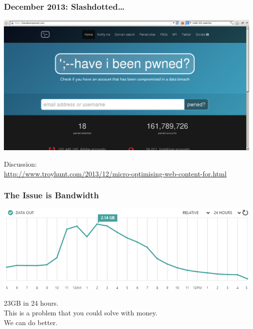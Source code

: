 \documentclass[aspectratio=43]{beamer}
\newenvironment{changemargin}[1]{%
  \begin{list}{}{%
    \setlength{\topsep}{0pt}%
    \setlength{\leftmargin}{#1}%
    \setlength{\rightmargin}{1em}
    \setlength{\listparindent}{\parindent}%
    \setlength{\itemindent}{\parindent}%
    \setlength{\parsep}{\parskip}%
  }%
  \item[]}{\end{list}}
\begin{document}
\begin{frame}
  \frametitle{December 2013: Slashdotted\ldots}

  \begin{center}
    \includegraphics[width=.9\textwidth]{L22/haveibeenpwned.png}
  \end{center}

  Discussion: \\  \hspace*{1em} {\scriptsize \url{http://www.troyhunt.com/2013/12/micro-optimising-web-content-for.html}}
  
\end{frame}

\begin{frame}
  \frametitle{The Issue is Bandwidth}

  \begin{center}
    \includegraphics[width=.9\textwidth]{L22/bandwidth-usage.png}
  \end{center}

  \begin{changemargin}{2cm}
  23GB in 24 hours.\\[1em]
  
  This is a problem that you could solve with money. \\ We can do better.
  \end{changemargin}

\end{frame}
\end{document}
